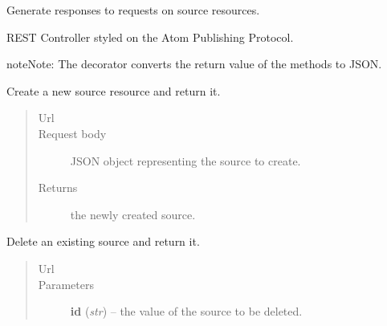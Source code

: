 \documentclass[letterpaper,10pt,english]{sphinxmanual}
\begin{document}
\begin{fulllineitems}
\label{api:onlinelinguisticdatabase.controllers.sources.SourcesController}
Generate responses to requests on source resources.

REST Controller styled on the Atom Publishing Protocol.

\begin{notice}{note}{Note:}
The  decorator converts the return value of the methods to
JSON.
\end{notice}

\begin{fulllineitems}
\label{api:onlinelinguisticdatabase.controllers.sources.SourcesController.create}
Create a new source resource and return it.
\begin{quote}\begin{description}
\item[{Url }] \leavevmode
{}

\item[{Request body}] \leavevmode
JSON object representing the source to create.

\item[{Returns}] \leavevmode
the newly created source.

\end{description}\end{quote}

\end{fulllineitems}


\begin{fulllineitems}
\label{api:onlinelinguisticdatabase.controllers.sources.SourcesController.delete}
Delete an existing source and return it.
\begin{quote}\begin{description}
\item[{Url }] \leavevmode
{}

\item[{Parameters}] \leavevmode
\textbf{id} (\emph{str}) -- the  value of the source to be deleted.


\end{description}
\end{quote}
\end{fulllineitems}
\end{fulllineitems}
\end{document}
